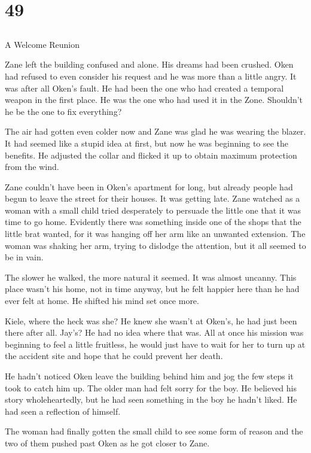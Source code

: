 \chapter{49}
\section{}
A Welcome Reunion  

Zane left the building confused and alone.  His dreams had been crushed.  Oken had refused to even consider his request and he was more than a little angry.  It was after all Oken's fault.  He had been the one who had created a temporal weapon in the first place.  He was the one who had used it in the Zone.  Shouldn't he be the one to fix everything?

The air had gotten even colder now and Zane was glad he was wearing the blazer.  It had seemed like a stupid idea at first, but now he was beginning to see the benefits.  He adjusted the collar and flicked it up to obtain maximum protection from the wind.

Zane couldn't have been in Oken's apartment for long, but already people had begun to leave the street for their houses.  It was getting late.  Zane watched as a woman with a small child tried desperately to persuade the little one that it was time to go home.  Evidently there was something inside one of the shops that the little brat wanted, for it was hanging off her arm like an unwanted extension.  The woman was shaking her arm, trying to dislodge the attention, but it all seemed to be in vain.

The slower he walked, the more natural it seemed.  It was almost uncanny.  This place wasn't his home, not in time anyway, but he felt happier here than he had ever felt at home.  He shifted his mind set once more.  

Kiele, where the heck was she?  He knew she wasn't at Oken's, he had just been there after all.  Jay's?  He had no idea where that was.  All at once his mission was beginning to feel a little fruitless, he would just have to wait for her to turn up at the accident site and hope that he could prevent her death.

He hadn't noticed Oken leave the building behind him and jog the few steps it took to catch him up.  The older man had felt sorry for the boy.  He believed his story wholeheartedly, but he had seen something in the boy he hadn't liked.  He had seen a reflection of himself.  

The woman had finally gotten the small child to see some form of reason and the two of them pushed past Oken as he got closer to Zane.

